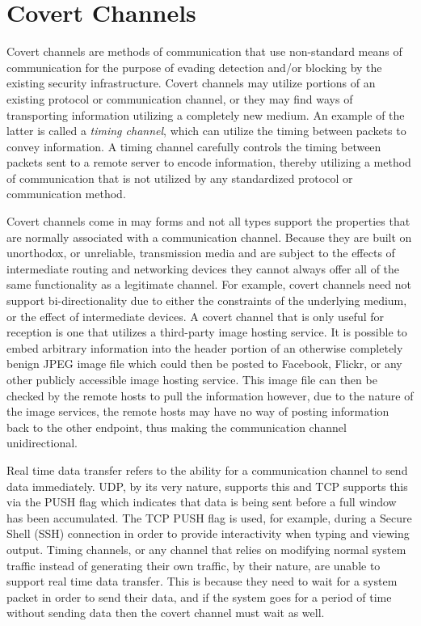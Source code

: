 \documentclass[12pt]{report}
\theoremstyle{remark}
\theoremstyle{definition}
\theoremstyle{definition}
\theoremstyle{definition}
\begin{document}
\section{Covert Channels}

Covert channels are methods of communication that use non-standard means of
communication for the purpose of evading detection and/or blocking by the
existing security infrastructure. Covert channels may utilize portions of an
existing protocol\cite{Born2010.psudp} or communication channel, or they may find ways of
transporting information utilizing a completely new medium. An example of the
latter is called a \emph{timing channel}\cite{Sellke2009}, which can utilize the timing between
packets to convey information. A timing channel carefully controls the timing
between packets sent to a remote server to encode information, thereby utilizing
a method of communication that is not utilized by any standardized protocol
or communication method.

Covert channels come in may forms and not all types support the properties that
are normally associated with a communication channel. Because they are built on
unorthodox, or unreliable, transmission media and are subject to the effects of
intermediate routing and networking devices they cannot always offer all of the
same functionality as a legitimate channel. For example, covert channels need
not support bi-directionality due to either the constraints of the underlying
medium, or the effect of intermediate devices. A covert channel that is only
useful for reception is one that utilizes a third-party image hosting service.
It is possible to embed arbitrary information into the header portion of an
otherwise completely benign JPEG image file\cite{isoeic10918-1} which could then
be posted to Facebook, Flickr, or any other publicly accessible image hosting
service. This image file can then be checked by the remote hosts to pull the
information however, due to the nature of the image services, the remote hosts
may have no way of posting information back to the other endpoint, thus making
the communication channel unidirectional.

Real time data transfer refers to the ability for a communication channel to
send data immediately. UDP, by its very nature, supports this and TCP supports
this via the PUSH flag which indicates that data is being sent before a full
window has been accumulated. The TCP PUSH flag is used, for example, during a
Secure Shell (SSH) connection in order to provide interactivity when typing and
viewing output. Timing channels, or any channel that relies on modifying normal
system traffic instead of generating their own traffic, by their nature, are
unable to support real time data transfer. This is because they need to wait for
a system packet in order to send their data, and if the system goes for a period
of time without sending data then the covert channel must wait as well.
\end{document}
